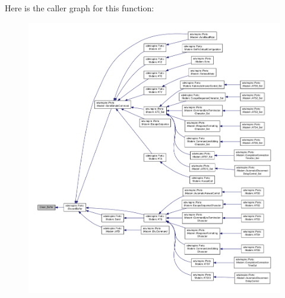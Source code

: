Here is the caller graph for this function\-:\nopagebreak
\begin{figure}[H]
\begin{center}
\leavevmode
\includegraphics[width=350pt]{libspire__serial_8vala_a740e10aea09874bdeb3c4641aeceb891_icgraph}
\end{center}
\end{figure}



